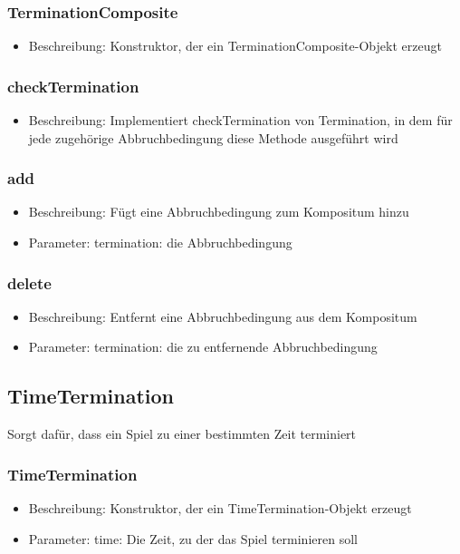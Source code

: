 \documentclass[a4paper]{scrreprt}
\begin{document}
	\subsubsection{TerminationComposite}
		\begin{itemize}
		\item Beschreibung: Konstruktor, der ein TerminationComposite-Objekt erzeugt	
		\end{itemize}
	\subsubsection{checkTermination}
	\begin{itemize}
		\item Beschreibung: Implementiert checkTermination von Termination, in dem für jede zugehörige Abbruchbedingung diese Methode ausgeführt wird
	\end{itemize}
	\subsubsection{add}
	\begin{itemize}
		\item Beschreibung: Fügt eine Abbruchbedingung zum Kompositum hinzu
		\item Parameter: termination: die Abbruchbedingung
	\end{itemize}
	\subsubsection{delete}
	\begin{itemize}
		\item Beschreibung: Entfernt eine Abbruchbedingung aus dem Kompositum
		\item Parameter: termination: die zu entfernende Abbruchbedingung
	\end{itemize}
	
	
	\subsection{TimeTermination}
	Sorgt dafür, dass ein Spiel zu einer bestimmten Zeit terminiert
	\subsubsection{TimeTermination}
		\begin{itemize}
		\item Beschreibung: Konstruktor, der ein TimeTermination-Objekt erzeugt
		\item Parameter: time: Die Zeit, zu der das Spiel terminieren soll	
		\end{itemize}
\end{document}
